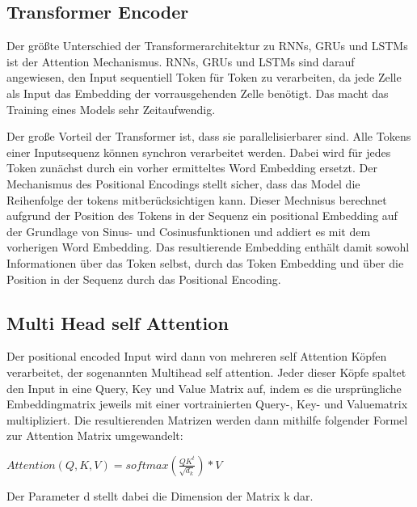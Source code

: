 \subsection{Transformer Encoder}

Der größte Unterschied der Transformerarchitektur zu RNNs, GRUs und LSTMs ist der Attention Mechanismus.
RNNs, GRUs und LSTMs sind darauf angewiesen, den Input sequentiell Token für Token zu verarbeiten, da jede Zelle als Input das Embedding der vorrausgehenden Zelle benötigt.
Das macht das Training eines Models sehr Zeitaufwendig.

Der große Vorteil der Transformer ist, dass sie parallelisierbarer sind.
Alle Tokens einer Inputsequenz können synchron verarbeitet werden. 
Dabei wird für jedes Token zunächst durch ein vorher ermitteltes Word Embedding ersetzt.
Der Mechanismus des Positional Encodings stellt sicher, dass das Model die Reihenfolge der tokens mitberücksichtigen kann.
Dieser Mechnisus berechnet aufgrund der Position des Tokens in der Sequenz ein positional Embedding auf der Grundlage von Sinus- und Cosinusfunktionen und addiert es mit dem vorherigen Word Embedding.
Das resultierende Embedding enthält damit sowohl Informationen über das Token selbst, durch das Token Embedding und über die Position in der Sequenz durch das Positional Encoding.


\subsection{Multi Head self Attention}

Der positional encoded Input wird dann von mehreren self Attention Köpfen verarbeitet, der sogenannten Multihead self attention. 
Jeder dieser Köpfe spaltet den Input in eine Query, Key und Value Matrix auf, indem es die ursprüngliche Embeddingmatrix jeweils mit einer vortrainierten Query-, Key- und Valuematrix multipliziert.
Die resultierenden Matrizen werden dann mithilfe folgender Formel zur Attention Matrix umgewandelt:

$Attention(Q,K,V)=softmax(\frac{QK^t}{\sqrt{d_k}})*V$

Der Parameter d stellt dabei die Dimension der Matrix k dar.


